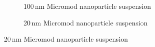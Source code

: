 \begin{figure}[H]
	
            \begin{subfigure}{0.49\textwidth}
                  \flushleft
                  \caption{100\,nm Micromod nanoparticle suspension}\label{subfig:micromod_100nm_peak}
          \end{subfigure}\hfill
        \begin{subfigure}{0.49\textwidth}
                \flushright
                \caption{20\,nm Micromod nanoparticle suspension}\label{subfig:micromod_20nm_peak}

\end{subfigure}
\end{figure}
